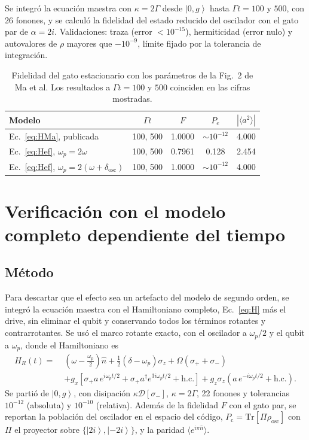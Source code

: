 \documentclass[11pt]{report}
\newcommand{\ket}[1]{\left|#1\right\rangle}
\newcommand{\spl}{\sigma_{+}}
\newcommand{\smi}{\sigma_{-}}
\begin{document}
Se integr\'o la ecuaci\'on maestra con $\kappa=2\Gamma$ desde $\ket{0,g}$ hasta $\Gamma t=100$ y $500$, con 26 fonones, y se calcul\'o la fidelidad del estado reducido del oscilador con el gato par de $\alpha=2i$. Validaciones: traza (error $<10^{-15}$), hermiticidad (error nulo) y autovalores de $\rho$ mayores que $-10^{-9}$, l\'imite fijado por la tolerancia de integraci\'on.

\begin{table}[h]
\centering
\begin{tabular}{lcccc}
\toprule
Modelo & $\Gamma t$ & $F$ & $P_{e}$ & $|\langle a^{2}\rangle|$\\
\midrule
Ec.~\eqref{eq:HMa}, publicada & 100, 500 & 1.0000 & $\sim10^{-12}$ & 4.000\\
Ec.~\eqref{eq:Hef}, $\omega_{p}=2\omega$ & 100, 500 & 0.7961 & 0.128 & 2.454\\
Ec.~\eqref{eq:Hef}, $\omega_{p}=2(\omega+\delta_{\mathrm{osc}})$ & 100, 500 & 1.0000 & $\sim10^{-12}$ & 4.000\\
\bottomrule
\end{tabular}
\caption{Fidelidad del gato estacionario con los par\'ametros de la Fig.~2 de Ma et al. Los resultados a $\Gamma t=100$ y $500$ coinciden en las cifras mostradas.}
\label{tab:F}
\end{table}


\section{Verificaci\'on con el modelo completo dependiente del tiempo}

\subsection{M\'etodo}

Para descartar que el efecto sea un artefacto del modelo de segundo orden, se integr\'o la ecuaci\'on maestra con el Hamiltoniano completo, Ec.~\eqref{eq:H} m\'as el drive, sin eliminar el qubit y conservando todos los t\'erminos rotantes y contrarrotantes. Se us\'o el marco rotante exacto, con el oscilador a $\omega_{p}/2$ y el qubit a $\omega_{p}$, donde el Hamiltoniano es
\begin{align}
H_{R}(t) =\;& \left(\omega-\tfrac{\omega_{p}}{2}\right)\hat n + \tfrac{1}{2}(\delta-\omega_{p})\sigma_{z} + \Omega(\spl+\smi)\nonumber\\
&+ g_{x}\left[\spl a\,e^{i\omega_{p}t/2} + \spl a^{\dagger}e^{3i\omega_{p}t/2} + \mathrm{h.c.}\right] + g_{z}\sigma_{z}\left(a\,e^{-i\omega_{p}t/2}+\mathrm{h.c.}\right).
\end{align}
Se parti\'o de $\ket{0,g}$, con disipaci\'on $\kappa\mathcal{D}[\smi]$, $\kappa=2\Gamma$, 22 fonones y tolerancias $10^{-12}$ (absoluta) y $10^{-10}$ (relativa). Adem\'as de la fidelidad $F$ con el gato par, se reportan la poblaci\'on del oscilador en el espacio del c\'odigo, $P_{\mathrm{c}}=\mathrm{Tr}[\Pi\rho_{\mathrm{osc}}]$ con $\Pi$ el proyector sobre $\{\ket{2i},\ket{-2i}\}$, y la paridad $\langle e^{i\pi\hat n}\rangle$.
\end{document}
